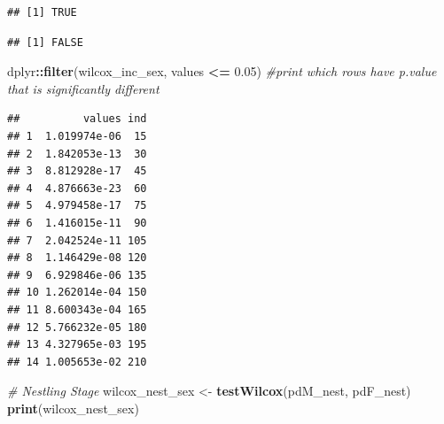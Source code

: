 \documentclass[]{article}
\newenvironment{Shaded}{\begin{snugshade}}{\end{snugshade}}
\newcommand{\CommentTok}[1]{\textcolor[rgb]{0.56,0.35,0.01}{\textit{#1}}}
\newcommand{\FloatTok}[1]{\textcolor[rgb]{0.00,0.00,0.81}{#1}}
\newcommand{\KeywordTok}[1]{\textcolor[rgb]{0.13,0.29,0.53}{\textbf{#1}}}
\newcommand{\NormalTok}[1]{#1}
\newcommand{\OperatorTok}[1]{\textcolor[rgb]{0.81,0.36,0.00}{\textbf{#1}}}
\newcommand{\StringTok}[1]{\textcolor[rgb]{0.31,0.60,0.02}{#1}}
\begin{document}
\begin{Shaded}
\end{Shaded}

\begin{verbatim}
## [1] TRUE
\end{verbatim}

\begin{Shaded}
\end{Shaded}

\begin{verbatim}
## [1] FALSE
\end{verbatim}

\begin{Shaded}
\begin{Highlighting}[]
\NormalTok{dplyr}\OperatorTok{::}\KeywordTok{filter}\NormalTok{(wilcox_inc_sex, values }\OperatorTok{<=}\StringTok{ }\FloatTok{0.05}\NormalTok{) }\CommentTok{#print which rows have p.value that is significantly different}
\end{Highlighting}
\end{Shaded}

\begin{verbatim}
##          values ind
## 1  1.019974e-06  15
## 2  1.842053e-13  30
## 3  8.812928e-17  45
## 4  4.876663e-23  60
## 5  4.979458e-17  75
## 6  1.416015e-11  90
## 7  2.042524e-11 105
## 8  1.146429e-08 120
## 9  6.929846e-06 135
## 10 1.262014e-04 150
## 11 8.600343e-04 165
## 12 5.766232e-05 180
## 13 4.327965e-03 195
## 14 1.005653e-02 210
\end{verbatim}

\begin{Shaded}
\begin{Highlighting}[]
\CommentTok{# Nestling Stage}
\NormalTok{wilcox_nest_sex <-}\StringTok{ }\KeywordTok{testWilcox}\NormalTok{(pdM_nest, pdF_nest)}
\KeywordTok{print}\NormalTok{(wilcox_nest_sex)}
\end{Highlighting}
\end{Shaded}
\end{document}
